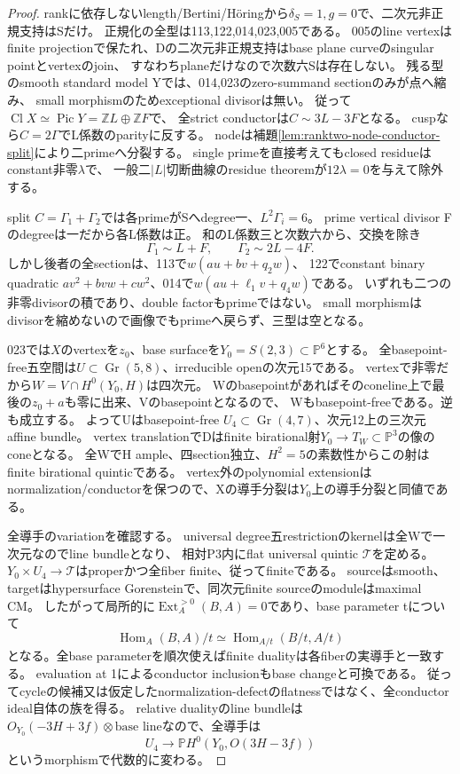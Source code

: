 \documentclass[a4paper,11pt]{ltjsarticle}
\theoremstyle{definition}
\begin{document}
\begin{proof}
rankに依存しないlength/Bertini/Höringから$\delta_S=1,g=0$で、二次元非正規支持はSだけ。
正規化の全型は113,122,014,023,005である。
005のline vertexはfinite projectionで保たれ、Dの二次元非正規支持はbase plane curveのsingular pointとvertexのjoin、
すなわちplaneだけなので次数六Sは存在しない。
残る型のsmooth standard model Yでは、014,023のzero-summand sectionのみが点へ縮み、
small morphismのためexceptional divisorは無い。
従って$\operatorname{Cl}X\simeq\operatorname{Pic}Y=\mathbb ZL\oplus\mathbb ZF$で、
全strict conductorは$C\sim3L-3F$となる。
cuspなら$C=2\Gamma$でL係数のparityに反する。
nodeは補題\ref{lem:ranktwo-node-conductor-split}により二primeへ分裂する。
single primeを直接考えてもclosed residueはconstant非零$\lambda$で、
一般二$|L|$切断曲線のresidue theoremが$12\lambda=0$を与えて除外する。

split $C=\Gamma_1+\Gamma_2$では各primeがSへdegree一、$L^2\Gamma_i=6$。
prime vertical divisor Fのdegreeは一だから各L係数は正。
和のL係数三と次数六から、交換を除き
\[
 \Gamma_1\sim L+F,\qquad\Gamma_2\sim2L-4F.
\]
しかし後者の全sectionは、113で$w(au+bv+q_2w)$、
122でconstant binary quadratic $av^2+bvw+cw^2$、014で$w(au+\ell_1v+q_4w)$である。
いずれも二つの非零divisorの積であり、double factorもprimeではない。
small morphismはdivisorを縮めないので画像でもprimeへ戻らず、三型は空となる。

023では$X$のvertexを$z_0$、base surfaceを$Y_0=S(2,3)\subset\mathbb P^6$とする。
全basepoint-free五空間は$U\subset\operatorname{Gr}(5,8)$、irreducible openの次元15である。
vertexで非零だから$W=V\cap H^0(Y_0,H)$は四次元。
Wのbasepointがあればそのconeline上で最後の$z_0+a$も零に出来、Vのbasepointとなるので、
Wもbasepoint-freeである。逆も成立する。
よってUはbasepoint-free $U_4\subset\operatorname{Gr}(4,7)$、次元12上の三次元affine bundle。
vertex translationでDはfinite birational射$Y_0\to T_W\subset\mathbb P^3$の像のconeとなる。
全WでH ample、四section独立、$H^2=5$の素数性からこの射はfinite birational quinticである。
vertex外のpolynomial extensionはnormalization/conductorを保つので、Xの導手分裂は$Y_0$上の導手分裂と同値である。

全導手のvariationを確認する。
universal degree五restrictionのkernelは全Wで一次元なのでline bundleとなり、
相対P3内にflat universal quintic $\mathcal T$を定める。
$Y_0\times U_4\to\mathcal T$はproperかつ全fiber finite、従ってfiniteである。
sourceはsmooth、targetはhypersurface Gorensteinで、同次元finite sourceのmoduleはmaximal CM。
したがって局所的に$\operatorname{Ext}_A^{>0}(B,A)=0$であり、base parameter tについて
\[
 \operatorname{Hom}_A(B,A)/t\simeq
 \operatorname{Hom}_{A/t}(B/t,A/t)
\]
となる。全base parameterを順次使えばfinite dualityは各fiberの実導手と一致する。
evaluation at 1によるconductor inclusionもbase changeと可換である。
従ってcycleの候補又は仮定したnormalization-defectのflatnessではなく、全conductor ideal自体の族を得る。
relative dualityのline bundleは
$O_{Y_0}(-3H+3f)\otimes\text{base line}$なので、全導手は
\[
 U_4\longrightarrow\mathbb P H^0(Y_0,O(3H-3f))
\]
というmorphismで代数的に変わる。


\end{proof}
\end{document}
